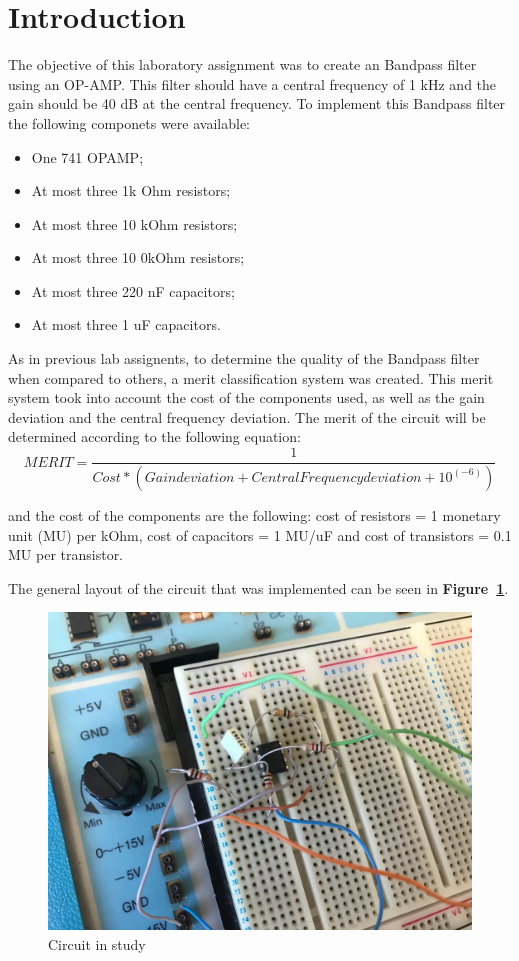 \section{Introduction}
\label{sec:introduction}


\par The objective of this laboratory assignment was to create an Bandpass filter using an OP-AMP. This filter should have a central frequency of 1 kHz and the gain should be 40 dB at the central frequency. To implement this Bandpass filter the following componets were available: 
\begin{itemize}

\item One 741 OPAMP;
\item At most three 1k Ohm resistors;
\item At most three 10 kOhm resistors;
\item At most three 10 0kOhm resistors;
\item At most three 220 nF capacitors;
\item At most three 1 uF capacitors.

\end{itemize} 


\par   
As in previous lab assignents, to determine the quality of the Bandpass filter when compared to others, a merit classification system was created. This merit system took into account the cost of the components used, as well as the gain deviation and the central frequency deviation. The merit of the circuit will be determined according to the following equation: 
\begin {equation}
	 MERIT = \frac{1}{Cost*(Gain deviation + Central Frequency deviation +10^(-6))  }   	
	\label{eq:i1}
\end{equation}

and the cost of the components are the following: cost of resistors = 1 monetary unit (MU) per kOhm, cost of capacitors = 1 MU/uF
and cost of transistors = 0.1 MU per transistor. 

The general layout of the circuit that was implemented can be seen in \textbf{Figure~\ref{fig:circuit_t5}}.\par
\begin{figure}[h] \centering
\includegraphics[width=0.6\linewidth]{circuit_t5.jpg}
\caption{Circuit in study}
\label{fig:circuit_t5}
\end{figure}



